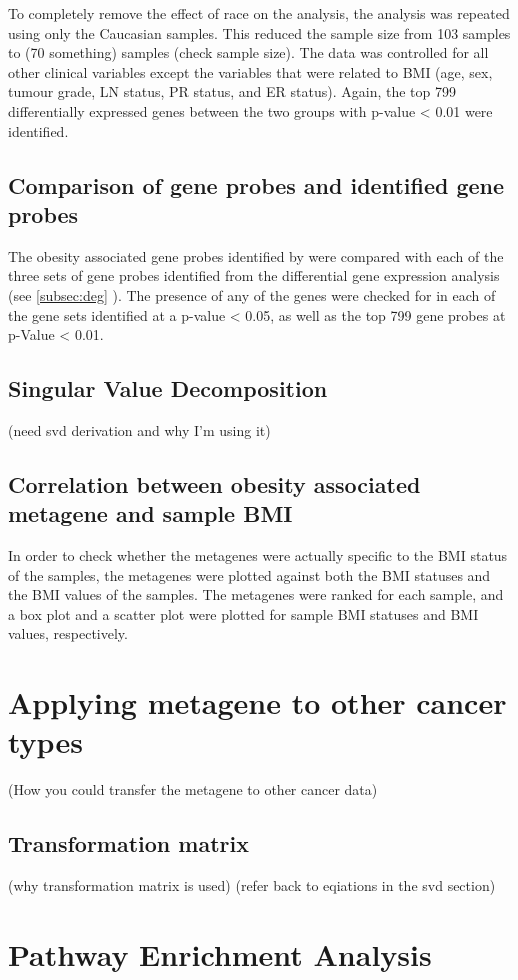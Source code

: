 To completely remove the effect of race on the analysis, the analysis was repeated using only the Caucasian samples.
This reduced the sample size from 103 samples to (70 something) samples (check sample size).
The data was controlled for all other clinical variables except the variables that were related to BMI (age, sex, tumour grade, LN status, PR status, and ER status).
Again, the top 799 differentially expressed genes between the two groups with p-value \textless{} 0.01 were identified.

\subsection{Comparison of \citet{Creighton2012} gene probes and identified gene probes}
\label{subsec:cfgeneprobes}

The obesity associated gene probes identified by \citet{Creighton2012} were compared with each of the three sets of gene probes identified from the differential gene expression analysis (see \ref{subsec:deg} ).
The presence of any of the \citet{Creighton2012} genes were checked for in each of the gene sets identified at a p-value \textless{} 0.05, as well as the top 799 gene probes at p-Value \textless{} 0.01.

\subsection{Singular Value Decomposition}
\label{subsec:svd}

(need svd derivation and why I'm using it)

\subsection{Correlation between obesity associated metagene and sample BMI}
\label{subsec:metavsbmi}

In order to check whether the metagenes were actually specific to the BMI status of the samples, the metagenes were plotted against both the BMI statuses and the BMI values of the samples.
The metagenes were ranked for each sample, and a box plot and a scatter plot were plotted for sample BMI statuses and BMI values, respectively.

\section{Applying metagene to other cancer types}
\label{sec:metagene}

(How you could transfer the metagene to other cancer data)

\subsection{Transformation matrix}
\label{subsec:transmat}

(why transformation matrix is used)
(refer back to eqiations in the  svd section)

\section{Pathway Enrichment Analysis}
\label{sec:pathenrich}







